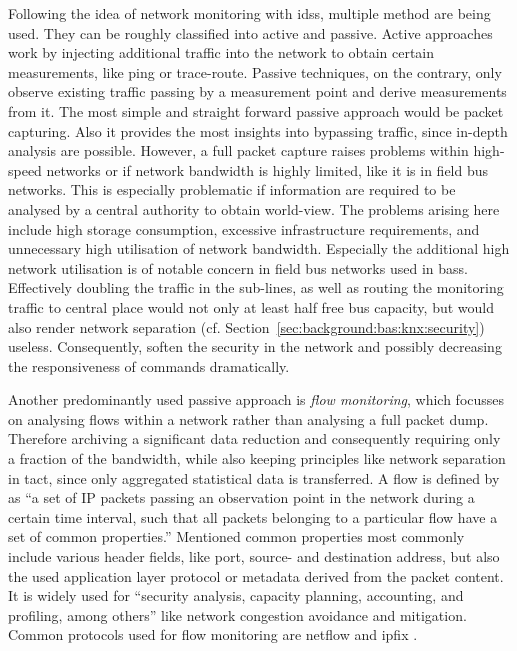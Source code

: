 Following the idea of network monitoring with \glspl{ids}, multiple method are being used. They can be roughly classified into active and passive. 
Active approaches work by injecting additional traffic into the network to obtain certain measurements, like ping or trace-route.
Passive techniques, on the contrary, only observe existing traffic passing by a measurement point and derive measurements from it. The most simple and straight forward passive approach would be packet capturing. Also it provides the most insights into bypassing traffic, since in-depth analysis are possible. However, a full packet capture raises problems within high-speed networks or if network bandwidth is highly limited, like it is in field bus networks. This is especially problematic if information are required to be analysed by a central authority to obtain world-view. The problems arising here include high storage consumption, excessive infrastructure requirements, and unnecessary high utilisation of network bandwidth.
\parencite{Hofstede2014}
Especially the additional high network utilisation is of notable concern in field bus networks used in \glspl{bas}. Effectively doubling the traffic in the sub-lines, as well as routing the monitoring traffic to central place would not only at least half free bus capacity, but would also render network separation (cf. Section~\ref{sec:background:bas:knx:security}) useless. Consequently, soften the security in the network and possibly decreasing the responsiveness of commands dramatically.

Another predominantly used passive approach is \emph{flow monitoring}, which focusses on analysing flows within a network rather than analysing a full packet dump. Therefore archiving a significant data reduction and consequently requiring only a fraction of the bandwidth, while also keeping principles like network separation in tact, since only aggregated statistical data is transferred.
A flow is defined by \textcite{Claise2013} as \enquote{a set of IP packets passing an observation point in the network during a certain time interval, such that all packets belonging to a particular flow have a set of common properties.}
Mentioned common properties most commonly include various header fields, like port, source- and destination address, but also the used application layer protocol or metadata derived from the packet content.
It is widely used for \enquote{security analysis, capacity planning, accounting, and profiling, among others} \parencite{Hofstede2014} like network congestion avoidance and mitigation.
Common protocols used for flow monitoring are \gls{netflow} \parencite{Claise2004} and \gls{ipfix} \parencite{Claise2013}.

